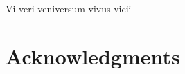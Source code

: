 \chapter*{}

\begin{center}
Vi veri veniversum vivus vicii
\end{center}


\chapter*{Acknowledgments}
\newpage